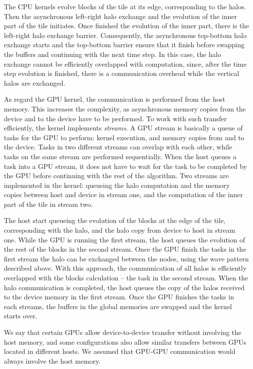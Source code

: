 The CPU kernels evolve blocks of the tile at its edge, corresponding to the halos. Then the asynchronous left-right halo exchange and the evolution of the inner part of the tile initiates. Once finished the evolution of the inner part, there is the left-right halo exchange barrier. Consequently, the asynchronous top-bottom halo exchange starts and the top-bottom barrier ensure that it finish before swapping the buffers and continuing with the next time step. In this case, the halo exchange cannot be efficiently overlapped with computation, since, after the time step evolution is finished, there is a communication overhead while the vertical halos are exchanged.

As regard the GPU kernel, the communication is performed from the host memory. This increases the complexity, as asynchronous memory copies from the device and to the device have to be performed. To work with such transfer efficiently, the kernel implements \textit{streams}. A GPU stream is basically a queue of tasks for the GPU to perform: kernel execution, and memory copies from and to the device. Tasks in two different streams can overlap with each other, while tasks on the same stream are performed sequentially. When the host queues a task into a GPU stream, it does not have to wait for the task to be completed by the GPU before continuing with the rest of the algorithm. Two streams are implemented in the kernel: queueing the halo computation and the memory copies between host and device in stream one, and the computation of the inner part of the tile in stream two.

The host start queueing the evolution of the blocks at the edge of the tile, corresponding with the halo, and the halo copy from device to host in stream one. While the GPU is running the first stream, the host queues the evolution of the rest of the blocks in the second stream. Once the GPU finish the tasks in the first stream the halo can be exchanged between the nodes, using the wave pattern described above. With this approach, the communication of all halos is efficiently overlapped with the blocks calculation -- the task in the second stream. When the halo communication is completed, the host queues the copy of the halos received to the device memory in the first stream. Once the GPU finishes the tasks in each streams, the buffers in the global memories are swapped and the kernel starts over.

We say that certain GPUs allow device-to-device transfer without involving the host memory, and some configurations also allow similar transfers between GPUs located in different hosts. We assumed that GPU-GPU communication would always involve the host memory.

